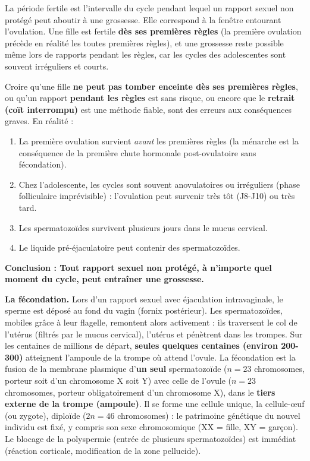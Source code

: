 \documentclass[11pt]{article}
\newcommand{\cle}[1]{{\popxbold\color{popdark}#1}}
\newcounter{popsec}
\newcounter{popsub}
\newcommand{\courssub}[1]{%
  \stepcounter{popsub}%
  \par\vspace{9pt}\noindent{\popxbold\fontsize{11.5}{13}\selectfont\color{popink}{\color{poporange}\thepopsec.\thepopsub}\hspace{6pt}#1}\par\nopagebreak\vspace{4pt}
}
\begin{document}
\begin{definition}
La \cle{période fertile} est l'intervalle du cycle pendant lequel un rapport sexuel non protégé peut aboutir à une grossesse. Elle correspond à la fenêtre entourant l'ovulation. Une fille est fertile \textbf{dès ses premières règles} (la première ovulation précède en réalité les toutes premières règles), et une grossesse reste possible même lors de rapports pendant les règles, car les cycles des adolescentes sont souvent irréguliers et courts.
\end{definition}

\begin{attention}
Croire qu'une fille \textbf{ne peut pas tomber enceinte dès ses premières règles}, ou qu'un rapport \textbf{pendant les règles} est sans risque, ou encore que le \textbf{retrait (coït interrompu)} est une méthode fiable, sont des erreurs aux conséquences graves. En réalité :
\begin{enumerate}
\item La première ovulation survient \emph{avant} les premières règles (la ménarche est la conséquence de la première chute hormonale post-ovulatoire sans fécondation).
\item Chez l'adolescente, les cycles sont souvent anovulatoires ou irréguliers (phase folliculaire imprévisible) : l'ovulation peut survenir très tôt (J8-J10) ou très tard.
\item Les spermatozoïdes survivent plusieurs jours dans le mucus cervical.
\item Le liquide pré-éjaculatoire peut contenir des spermatozoïdes.
\end{enumerate}
\textbf{Conclusion : Tout rapport sexuel non protégé, à n'importe quel moment du cycle, peut entraîner une grossesse.}
\end{attention}

\courssub{La fécondation et la nidation}

\textbf{La fécondation.} Lors d'un rapport sexuel avec éjaculation intravaginale, le sperme est déposé au fond du vagin (fornix postérieur). Les spermatozoïdes, mobiles grâce à leur flagelle, remontent alors activement : ils traversent le col de l'utérus (filtrés par le mucus cervical), l'utérus et pénètrent dans les trompes. Sur les centaines de millions de départ, \textbf{seules quelques centaines (environ 200-300)} atteignent l'ampoule de la trompe où attend l'ovule. La \cle{fécondation} est la fusion de la membrane plasmique d'\textbf{un seul} spermatozoïde ($n = 23$ chromosomes, porteur soit d'un chromosome X soit Y) avec celle de l'ovule ($n = 23$ chromosomes, porteur obligatoirement d'un chromosome X), dans le \textbf{tiers externe de la trompe (ampoule)}. Il se forme une cellule unique, la \cle{cellule-œuf} (ou zygote), diploïde ($2n = 46$ chromosomes) : le patrimoine génétique du nouvel individu est fixé, y compris son sexe chromosomique (XX = fille, XY = garçon). Le blocage de la polyspermie (entrée de plusieurs spermatozoïdes) est immédiat (réaction corticale, modification de la zone pellucide).
\end{document}

